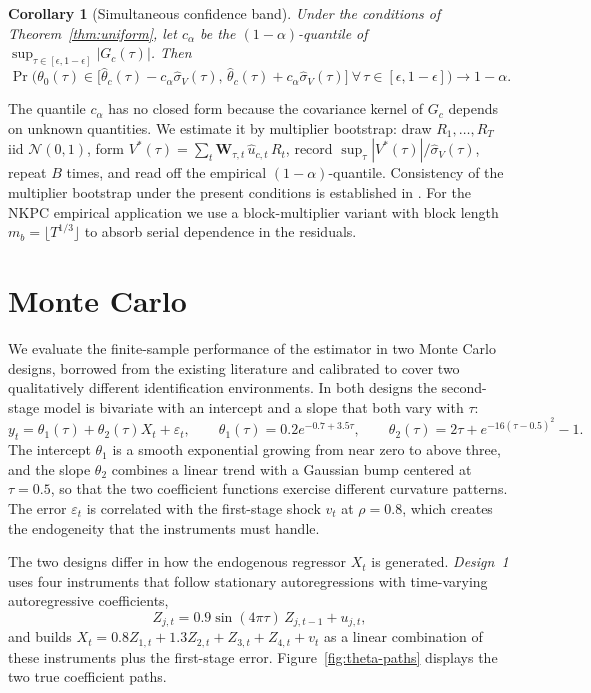 \documentclass[12pt]{article}
\newcommand{\bfW}{\mathbf{W}}
\newtheorem{corollary}[theorem]{Corollary}
\begin{document}
\begin{corollary}[Simultaneous confidence band]\label{cor:scb}
Under the conditions of Theorem~\ref{thm:uniform}, let $c_\alpha$ be the $(1-\alpha)$-quantile of $\sup_{\tau \in [\epsilon, 1-\epsilon]} |G_c(\tau)|$. Then
\[
  \Pr\bigl(\theta_0(\tau) \in \bigl[\hat\theta_c(\tau) - c_\alpha\hat\sigma_V(\tau),\, \hat\theta_c(\tau) + c_\alpha\hat\sigma_V(\tau)\bigr] \ \forall\, \tau \in [\epsilon, 1-\epsilon]\bigr) \to 1 - \alpha.
\]
\end{corollary}
The quantile $c_\alpha$ has no closed form because the covariance kernel of $G_c$ depends on unknown quantities. We estimate it by multiplier bootstrap: draw $R_1, \ldots, R_T$ iid $\mathcal{N}(0,1)$, form $V^*(\tau) = \sum_t \bfW_{\tau,t}\, \hat u_{c,t}\, R_t$, record $\sup_\tau |V^*(\tau)|/\hat\sigma_V(\tau)$, repeat $B$ times, and read off the empirical $(1-\alpha)$-quantile. Consistency of the multiplier bootstrap under the present conditions is established in \citet{ZhouWu2010}. For the NKPC empirical application we use a block-multiplier variant with block length $m_b = \lfloor T^{1/3}\rfloor$ to absorb serial dependence in the residuals.

\section{Monte Carlo}\label{sec:mc}

We evaluate the finite-sample performance of the estimator in two Monte Carlo designs, borrowed from the existing literature and calibrated to cover two qualitatively different identification environments. In both designs the second-stage model is bivariate with an intercept and a slope that both vary with $\tau$:
\[
  y_t = \theta_1(\tau) + \theta_2(\tau) X_t + \varepsilon_t, \qquad
  \theta_1(\tau) = 0.2 e^{-0.7 + 3.5\tau},
  \qquad
  \theta_2(\tau) = 2\tau + e^{-16(\tau - 0.5)^2} - 1.
\]
The intercept $\theta_1$ is a smooth exponential growing from near zero to above three, and the slope $\theta_2$ combines a linear trend with a Gaussian bump centered at $\tau = 0.5$, so that the two coefficient functions exercise different curvature patterns. The error $\varepsilon_t$ is correlated with the first-stage shock $v_t$ at $\rho = 0.8$, which creates the endogeneity that the instruments must handle.

The two designs differ in how the endogenous regressor $X_t$ is generated. \emph{Design~1} uses four instruments that follow stationary autoregressions with time-varying autoregressive coefficients,
\[
  Z_{j,t} = 0.9 \sin(4\pi\tau)\, Z_{j,t-1} + u_{j,t},
\]
and builds $X_t = 0.8 Z_{1,t} + 1.3 Z_{2,t} + Z_{3,t} + Z_{4,t} + v_t$ as a linear combination of these instruments plus the first-stage error. Figure~\ref{fig:theta-paths} displays the two true coefficient paths.
\end{document}
